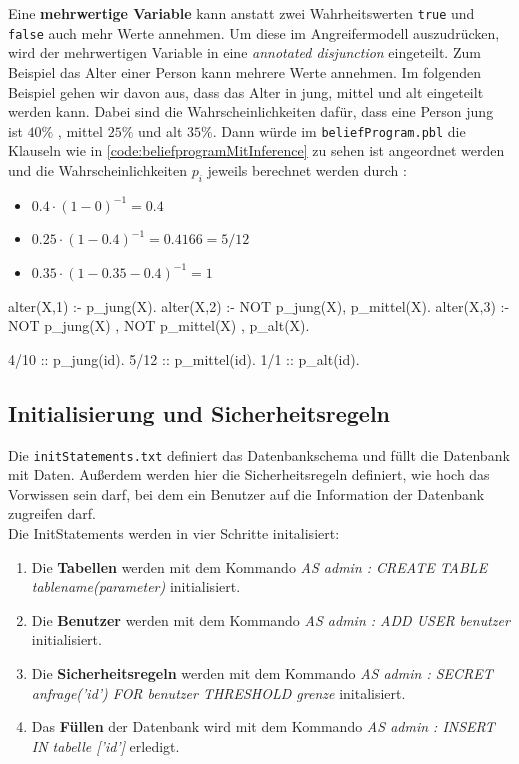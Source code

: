 \documentclass[german,version-2020-11]{uzl-thesis}
\begin{document}
Eine \textbf{mehrwertige Variable} kann anstatt zwei Wahrheitswerten \texttt{true} und \texttt{false} auch mehr Werte annehmen.
Um diese im Angreifermodell auszudrücken, wird der mehrwertigen Variable in eine \textit{annotated disjunction} eingeteilt. Zum Beispiel das Alter einer Person kann mehrere Werte annehmen. Im folgenden Beispiel gehen wir davon aus, dass das Alter in jung, mittel und alt eingeteilt werden kann. Dabei sind die Wahrscheinlichkeiten dafür, dass eine Person jung ist $40\%$ , mittel $25\%$ und alt $35\%$. Dann würde im \texttt{beliefProgram.pbl} die Klauseln wie in \autoref{code:beliefprogramMitInference} zu sehen ist angeordnet werden und die Wahrscheinlichkeiten $p_i$ jeweils berechnet werden durch : 
\begin{itemize}
	\item $0.4 \cdot (1- 0)^{-1} = 0.4 $
	\item  $0.25 \cdot (1 - 0.4)^{-1} = 0.4166 = 5/12 $
	\item $ 0.35 \cdot (1 - 0.35 - 0.4)^{-1} = 1 $
\end{itemize}

\begin{Pseudocode}[caption={\texttt{beliefProgram.pbl} für Knoten mit Abhängigkeiten}, label={code:beliefprogramMitInference}]
alter(X,1) :- p_jung(X).
alter(X,2) :- NOT p_jung(X), p_mittel(X).
alter(X,3) :- NOT p_jung(X) , NOT p_mittel(X) , p_alt(X).

4/10 :: p_jung(id).
5/12 :: p_mittel(id).
1/1 :: p_alt(id).
\end{Pseudocode} 


\subsection{Initialisierung und Sicherheitsregeln}
Die \texttt{initStatements.txt} definiert das Datenbankschema und füllt die Datenbank mit Daten. Außerdem werden hier die Sicherheitsregeln definiert, wie hoch das Vorwissen sein darf, bei dem ein Benutzer auf die Information der Datenbank zugreifen darf. \\ 
Die InitStatements werden in vier Schritte initalisiert:
\begin{enumerate}
	\item Die \textbf{Tabellen } werden mit dem Kommando \textit{AS admin : CREATE TABLE tablename(parameter)} initialisiert. 
	\item  Die \textbf{Benutzer  } werden mit dem Kommando \textit{AS admin : ADD USER benutzer} initialisiert. 
	\item Die \textbf{Sicherheitsregeln}  werden mit dem Kommando \textit{AS admin : SECRET anfrage('id') FOR benutzer THRESHOLD grenze} initalisiert.
	\item Das \textbf{Füllen} der Datenbank wird mit dem Kommando \textit{AS admin : INSERT IN tabelle ['id']} erledigt.
\end{enumerate} 
\end{document}
